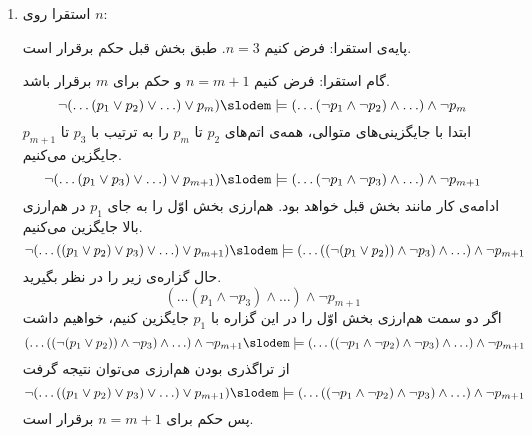 \begin{ans}
\begin{enumerate}
      \item
      استقرا روی $n$:
  
      پایه‌ی استقرا:
      فرض کنیم $n = 3$. طبق بخش قبل حکم برقرار است.
  
      گام استقرا:
      فرض کنیم $n = m+1$ و حکم برای $m$ برقرار باشد.
      $$\neg(\ldots(p_1\vee p_2)\vee \ldots)\vee p_m)\slodem\models (\ldots(\neg p_1\wedge \neg p_2)\wedge\ldots)\wedge\neg p_m$$
      ابتدا با جایگزینی‌های متوالی، همه‌ی اتم‌های $p_2$ تا $p_m$ را به ترتیب با $p_3$ تا $p_{m+1}$ جایگزین می‌کنیم.
      $$\neg(\ldots(p_1\vee p_3)\vee \ldots)\vee p_{m+1})\slodem\models (\ldots(\neg p_1\wedge \neg p_3)\wedge\ldots)\wedge\neg p_{m+1}$$
      ادامه‌ی کار مانند بخش قبل خواهد بود. هم‌ارزی بخش اوّل را به جای $p_1$ در هم‌ارزی بالا جایگزین می‌کنیم.
      $$\neg(\ldots((p_1 \vee p_2) \vee p_3)\vee \ldots)\vee p_{m+1})\slodem\models (\ldots((\neg (p_1 \vee p_2))\wedge \neg p_3)\wedge\ldots)\wedge\neg p_{m+1}$$
      حال گزاره‌ی زیر را در نظر بگیرید.
      $$(\ldots(p_1\wedge \neg p_3)\wedge\ldots)\wedge\neg p_{m+1}$$
      اگر دو سمت هم‌ارزی بخش اوّل را در این گزاره با $p_1$ جایگزین کنیم، خواهیم داشت
      $$ (\ldots((\neg (p_1 \vee p_2))\wedge \neg p_3)\wedge\ldots)\wedge\neg p_{m+1} \slodem\models (\ldots((\neg p_1 \wedge \neg p_2) \wedge \neg p_3)\wedge\ldots)\wedge\neg p_{m+1}  $$
      از تراگذری بودن هم‌ارزی می‌توان نتیجه گرفت
      $$ \neg(\ldots((p_1 \vee p_2) \vee p_3)\vee \ldots)\vee p_{m+1}) \slodem\models (\ldots((\neg p_1 \wedge \neg p_2) \wedge \neg p_3)\wedge\ldots)\wedge\neg p_{m+1}  $$
      پس حکم برای $n = m+1$ برقرار است.
    \end{enumerate}
  \end{ans}
  

